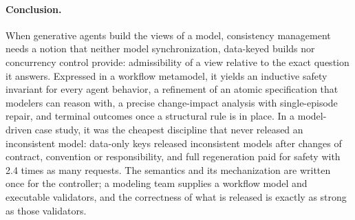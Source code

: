 \documentclass[pdflatex,sn-mathphys-num]{sn-jnl}
\theoremstyle{thmstyleone}%
\theoremstyle{thmstyletwo}%
\theoremstyle{thmstylethree}%
\newcommand{\SimFullRatio}{2.4}
\begin{document}
\paragraph{Conclusion.} When generative agents build the views of a model, consistency management needs a notion that neither model synchronization, data-keyed builds nor concurrency control provide: admissibility of a view relative to the exact question it answers. Expressed in a workflow metamodel, it yields an inductive safety invariant for every agent behavior, a refinement of an atomic specification that modelers can reason with, a precise change-impact analysis with single-episode repair, and terminal outcomes once a structural rule is in place. In a model-driven case study, it was the cheapest discipline that never released an inconsistent model: data-only keys released inconsistent models after changes of contract, convention or responsibility, and full regeneration paid for safety with \SimFullRatio{} times as many requests. The semantics and its mechanization are written once for the controller; a modeling team supplies a workflow model and executable validators, and the correctness of what is released is exactly as strong as those validators.

\backmatter
\end{document}
